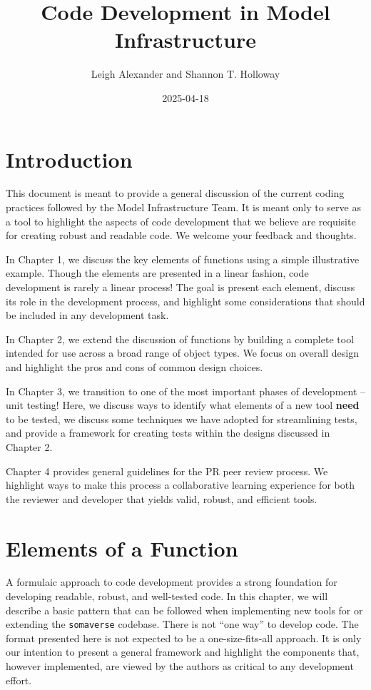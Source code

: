 \documentclass[
]{book}
\title{Code Development in Model Infrastructure}
\author{Leigh Alexander and Shannon T. Holloway}
\date{2025-04-18}
\begin{document}
\maketitle

{
\setcounter{tocdepth}{1}
\tableofcontents
}
\hypertarget{introduction}{%
\chapter*{Introduction}\label{introduction}}

This document is meant to provide a general discussion of the current coding practices followed by the Model Infrastructure Team. It is meant only to serve as a tool to highlight the aspects of code development that we believe are requisite for creating robust and readable code. We welcome your feedback and thoughts.

In Chapter 1, we discuss the key elements of functions using a simple illustrative example. Though the elements are presented in a linear fashion, code development is rarely a linear process! The goal is present each element, discuss its role in the development process, and highlight some considerations that should be included in any development task.

In Chapter 2, we extend the discussion of functions by building a complete tool intended for use across a broad range of object types. We focus on overall design and highlight the pros and cons of common design choices.

In Chapter 3, we transition to one of the most important phases of development -- unit testing! Here, we discuss ways to identify what elements of a new tool \textbf{need} to be tested, we discuss some techniques we have adopted for streamlining tests, and provide a framework for creating tests within the designs discussed in Chapter 2.

Chapter 4 provides general guidelines for the PR peer review process. We highlight ways to make this process a collaborative learning experience for both the reviewer and developer that yields valid, robust, and efficient tools.

\hypertarget{Functions}{%
\chapter{Elements of a Function}\label{Functions}}

A formulaic approach to code development provides a strong foundation for developing readable, robust, and well-tested code. In this chapter, we will describe a basic pattern that can be followed when implementing new tools for or extending the \texttt{somaverse} codebase. There is not ``one way'' to develop code. The format presented here is not expected to be a one-size-fits-all approach. It is only our intention to present a general framework and highlight the components that, however implemented, are viewed by the authors as critical to any development effort.
\end{document}
